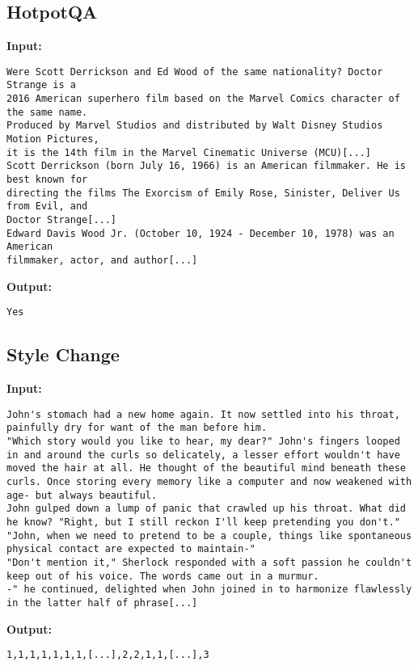 \documentclass[10pt, a4paper]{article}
\begin{document}
\subsection*{HotpotQA}
\textbf{Input:}
\begin{lstlisting}
Were Scott Derrickson and Ed Wood of the same nationality? Doctor Strange is a
2016 American superhero film based on the Marvel Comics character of the same name. 
Produced by Marvel Studios and distributed by Walt Disney Studios Motion Pictures, 
it is the 14th film in the Marvel Cinematic Universe (MCU)[...]
Scott Derrickson (born July 16, 1966) is an American filmmaker. He is best known for 
directing the films The Exorcism of Emily Rose, Sinister, Deliver Us from Evil, and 
Doctor Strange[...]
Edward Davis Wood Jr. (October 10, 1924 - December 10, 1978) was an American 
filmmaker, actor, and author[...]
\end{lstlisting}
\textbf{Output:}
\begin{lstlisting}
Yes
\end{lstlisting}
\subsection*{Style Change}
\textbf{Input:}
\begin{lstlisting}
John's stomach had a new home again. It now settled into his throat, painfully dry for want of the man before him.
"Which story would you like to hear, my dear?" John's fingers looped in and around the curls so delicately, a lesser effort wouldn't have moved the hair at all. He thought of the beautiful mind beneath these curls. Once storing every memory like a computer and now weakened with age- but always beautiful.
John gulped down a lump of panic that crawled up his throat. What did he know? "Right, but I still reckon I'll keep pretending you don't."
"John, when we need to pretend to be a couple, things like spontaneous physical contact are expected to maintain-"
"Don't mention it," Sherlock responded with a soft passion he couldn't keep out of his voice. The words came out in a murmur.
-" he continued, delighted when John joined in to harmonize flawlessly in the latter half of phrase[...]
\end{lstlisting}
\textbf{Output:}
\begin{lstlisting}
1,1,1,1,1,1,1,[...],2,2,1,1,[...],3
\end{lstlisting}
\end{document}
